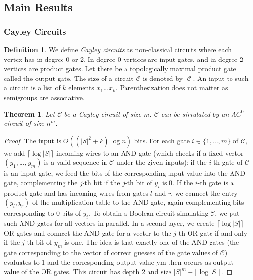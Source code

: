 \documentclass[a4paper,12pt]{article}
\theoremstyle{plain}
\newtheorem{theorem}{Theorem}
\theoremstyle{definition}
\newtheorem{defn}{Definition}
\theoremstyle{remark}
\begin{document}
\subsection{Main Results}
\subsubsection{Cayley Circuits}
\begin{defn}
  We define \textit{Cayley circuits} as non-classical circuits where each vertex has in-degree 0 or 2. In-degree 0 vertices are input gates, and in-degree 2 vertices are product gates. Let there be a topologically maximal product gate called the output gate. The size of a circuit $\mathcal{C}$ is denoted by $|\mathcal{C}|$. An input to such a circuit is a list of $k$ elements $x_1\dots x_k$. Parenthesization does not matter as semigroups are associative.
\end{defn}
\begin{theorem}
  Let $\mathcal{C}$ be a Cayley circuit of size $m$. $\mathcal{C}$ can be simulated by an $AC^0$ circuit of size $n^m$.
\end{theorem}
\begin{proof}
  The input is $O((|S|^2+k)\log n)$ bits. For each gate $i\in\{1,\dots,m\}$ of $\mathcal{C}$, we add $\lceil\log|S|\rceil$ incoming wires to an AND gate (which checks if a fixed vector $(y_1,\dots,y_m)$ is a valid sequence in $\mathcal{C}$ under the given inputs): if the $i$-th gate of $\mathcal{C}$ is an input gate, we feed the bits of the corresponding input value into the AND gate, complementing the $j$-th bit if the $j$-th bit of $y_i$ is 0. If the $i$-th gate is a product gate and has incoming wires from gates $l$ and $r$, we connect the entry $(y_l,y_r)$ of the multiplication table to the AND gate, again complementing bits corresponding to 0-bits of $y_i$.
  To obtain a Boolean circuit simulating $\mathcal{C}$, we put such AND gates for all vectors in parallel. In a second layer, we create $\lceil\log|S|\rceil$ OR gates and connect the AND gate for a vector to the $j$-th OR gate if and only if the $j$-th bit of $y_m$ is one. The idea is that exactly one of the AND gates (the gate corresponding to the vector of correct guesses of the gate values of $\mathcal{C}$) evaluates to 1 and the corresponding output value ym then occurs as output value of the OR gates.
  This circuit has depth 2 and size $|S|^m+\lceil\log|S|\rceil$.
\end{proof}
\end{document}
